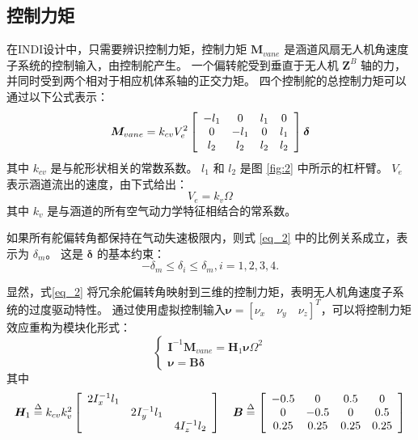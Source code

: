 \begin{ubox}
\subsection{控制力矩}
在INDI设计中，只需要辨识控制力矩，控制力矩 ${{\bm{M}}_{vane}} $ 是涵道风扇无人机角速度子系统的控制输入，由控制舵产生。 一个偏转舵受到垂直于无人机 ${{\bm{Z}}^{B}}$ 轴的力，并同时受到两个相对于相应机体系轴的正交力矩。 四个控制舵的总控制力矩可以通过以下公式表示：
\begin{equation}
{{\bm{M}}_{vane}} = {k_{cv}}V_e^2\left[ {\begin{array}{*{20}{c}}
	{{\rm{ - }}{l_1}}&0&{{l_1}}&0\\
	0&{{\rm{ - }}{l_1}}&0&{{l_1}}\\
	{{l_2}}&{{l_2}}&{{l_2}}&{{l_2}}
	\end{array}} \right]{\bm{\delta }}
\label{eq_2}
\end{equation}
其中 $ {{k}_{cv}} $ 是与舵形状相关的常数系数。 $ {{l}_{1}} $ 和 $ {{l}_{2}} $ 是图 \ref{fig:2} 中所示的杠杆臂。 ${{V}_{e}}$ 表示涵道流出的速度，由下式给出：
\begin{equation}
	{V_e} = {k_v}\Omega 
	\label{eq_3}
\end{equation}
其中 $ {{k}_{v}} $ 是与涵道的所有空气动力学特征相结合的常系数。 

如果所有舵偏转角都保持在气动失速极限内，则式 \eqref{eq_2} 中的比例关系成立，表示为 $ {{\delta }_{m}} $。 这是 ${\bm \delta}$ 的基本约束：
\begin{equation} 
	- {\delta _m} \le {\delta _i} \le {\delta _m},   i = 1,2,3,4.
	\label{eq_4}
\end{equation}

显然，式\eqref{eq_2} 将冗余舵偏转角映射到三维的控制力矩，表明无人机角速度子系统的过度驱动特性。 通过使用虚拟控制输入$ \bm{\nu }=[{\nu }_{x} \quad {\nu }_{y} \quad {\nu }_{z}]^{T}$，可以将控制力矩效应重构为模块化形式：
\begin{equation}
	\left\{ \begin{array}{l}
	{{\bm{I}}^{ - 1}}{{\bm{M}}_{vane}} = {{\bm{H}}_1}{\bm{\nu }}{\Omega ^2}\\
	{\bm{\nu }} = {\bm{B\delta }}
	\end{array} \right.
	\label{eq_5}
	\end{equation}
其中
	\begin{equation}
	\begin{array}{ccccc}
	{{\bm{H}}_1} \buildrel \Delta \over =   {k_{cv}}k_v^2\left[ {\begin{array}{*{20}{c}}
		{2I_x^{ - 1}{l_1}}&{}&{}\\
		{}&{2I_y^{ - 1}{l_1}}&{}\\
		{}&{}&{4I_z^{ - 1}{l_2}}
		\end{array}} \right]     \quad
	{\bm{B}} \buildrel \Delta \over =   \left[ {\begin{array}{*{20}{c}}
		{ - 0.5}&0&{0.5}&0\\
		0&{ - 0.5}&0&{0.5}\\
		{0.25}&{0.25}&{0.25}&{0.25}
		\end{array}} \right]
	\end{array}
	\label{eq_6}
\end{equation}


\end{ubox}

